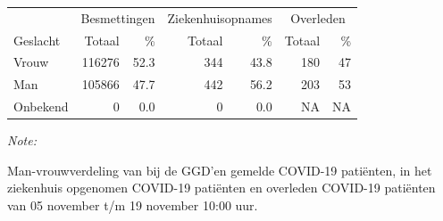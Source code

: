 \documentclass[
  english,
  man,floatsintext]{apa6}
\begin{document}
\begin{table}
\centering\begingroup\fontsize{11}{13}\selectfont

\begin{threeparttable}
\begin{tabular}{lrrrrrr}
\toprule
\multicolumn{1}{c}{ } & \multicolumn{2}{c}{Besmettingen} & \multicolumn{2}{c}{Ziekenhuisopnames} & \multicolumn{2}{c}{Overleden} \\
\cmidrule(l{3pt}r{3pt}){2-3} \cmidrule(l{3pt}r{3pt}){4-5} \cmidrule(l{3pt}r{3pt}){6-7}
Geslacht & Totaal & \% & Totaal & \% & Totaal & \%\\
\midrule
Vrouw & 116276 & 52.3 & 344 & 43.8 & 180 & 47\\
Man & 105866 & 47.7 & 442 & 56.2 & 203 & 53\\
Onbekend & 0 & 0.0 & 0 & 0.0 & NA & NA\\
\bottomrule
\end{tabular}
\begin{tablenotes}
\item \textit{Note: } 
\item Man-vrouwverdeling van bij de GGD’en gemelde COVID-19 patiënten, in het ziekenhuis opgenomen COVID-19 patiënten en overleden COVID-19 patiënten van 05 november t/m 19 november 10:00 uur.
\end{tablenotes}
\end{threeparttable}
\endgroup{}
\end{table}
\newpage
\end{document}
